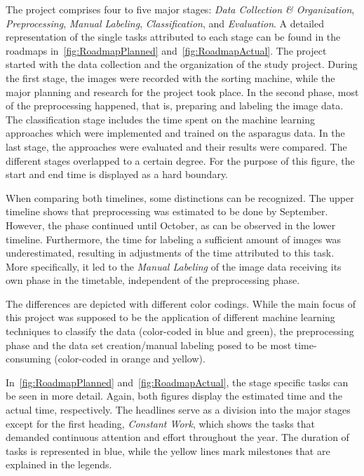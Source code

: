 The project comprises four to five major stages: \textit{Data Collection \& Organization}, \textit{Preprocessing}, \textit{Manual Labeling}, \textit{Classification}, and \textit{Evaluation}. A detailed representation of the single tasks attributed to each stage can be found in the roadmaps in~\autoref{fig:RoadmapPlanned} and~\autoref{fig:RoadmapActual}. The project started with the data collection and the organization of the study project. During the first stage, the images were recorded with the sorting machine, while the major planning and research for the project took place. In the second phase, most of the preprocessing happened, that is, preparing and labeling the image data. The classification stage includes the time spent on the machine learning approaches which were implemented and trained on the asparagus data. In the last stage, the approaches were evaluated and their results were compared. The different stages overlapped to a certain degree. For the purpose of this figure, the start and end time is displayed as a hard boundary.

When comparing both timelines, some distinctions can be recognized. The upper timeline shows that preprocessing was estimated to be done by September. However, the phase continued until October, as can be observed in the lower timeline. Furthermore, the time for labeling a sufficient amount of images was underestimated, resulting in adjustments of the time attributed to this task. More specifically, it led to the \textit{Manual Labeling} of the image data receiving its own phase in the timetable, independent of the preprocessing phase.

The differences are depicted with different color codings. While the main focus of this project was supposed to be the application of different machine learning techniques to classify the data (color-coded in blue and green), the preprocessing phase and the data set creation/manual labeling posed to be most time-consuming (color-coded in orange and yellow).

In~\autoref{fig:RoadmapPlanned} and~\autoref{fig:RoadmapActual}, the stage specific tasks can be seen in more detail. Again, both figures display the estimated time and the actual time, respectively. The headlines serve as a division into the major stages except for the first heading, \emph{Constant Work}, which shows the tasks that demanded continuous attention and effort throughout the year. The duration of tasks is represented in blue, while the yellow lines mark milestones that are explained in the legends.

